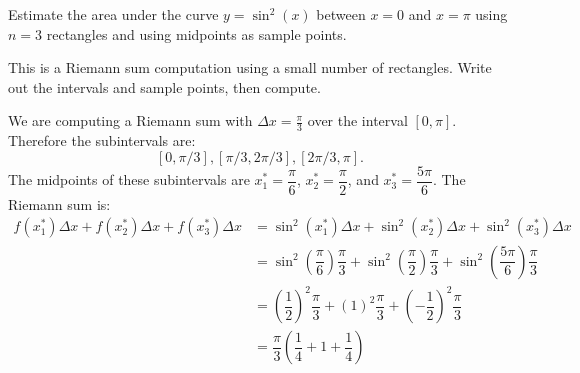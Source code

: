 \documentclass{ximera}
\author{Emma Smith Zbarsky \and Bobby Ramsey}
\begin{document}
\begin{exercise}
Estimate the area under the curve $y=\sin^2(x)$ between $x=0$ and
$x=\pi$ using $n=3$ rectangles and using midpoints as sample points.


\begin{hint}
	This is a Riemann sum computation using a small number of rectangles. Write out the intervals
	and sample points, then compute.
\end{hint}


\begin{hint}
	We are computing a Riemann sum with $\Delta x = \frac{\pi}{3}$ over the
	interval $[0,\pi]$. Therefore the subintervals are:
	\[[0,\pi/3], [\pi/3,2\pi/3], [2\pi/3,\pi].\] The midpoints of these subintervals are $x_1^* = \dfrac{\pi}{6}$, $x_2^* = \dfrac{\pi}{2}$, 
	and $x_3^* = \dfrac{5\pi}{6}$.
	The Riemann sum is:
	\begin{align*}
		f(x_1^*)\Delta x + f(x_2^*)\Delta x + f(x_3^*)\Delta x 
			&= \sin^2\left(x_1^*\right) \Delta x + \sin^2\left(x_2^*\right) \Delta x + \sin^2\left(x_3^*\right) \Delta x\\
			&= \sin^2\left(\dfrac{\pi}{6}\right) \dfrac{\pi}{3} + \sin^2\left(\dfrac{\pi}{2}\right) \dfrac{\pi}{3} 
				+ \sin^2\left(\dfrac{5\pi}{6}\right) \dfrac{\pi}{3}\\
			&= \left( \dfrac{1}{2}\right)^2 \dfrac{\pi}{3} + \left( 1\right)^2 \dfrac{\pi}{3} + \left( -\dfrac{1}{2}\right)^2 \dfrac{\pi}{3}\\
			&= \dfrac{\pi}{3}\left( \dfrac{1}{4} + 1 + \dfrac{1}{4} \right)
	\end{align*}
\end{hint}


\begin{multipleChoice}
\end{multipleChoice}

\end{exercise}
\end{document}
